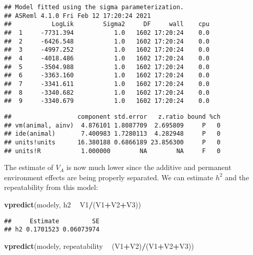 \documentclass[12pt,]{book}
\newenvironment{Shaded}{\begin{snugshade}}{\end{snugshade}}
\newcommand{\KeywordTok}[1]{\textcolor[rgb]{0.13,0.29,0.53}{\textbf{#1}}}
\newcommand{\NormalTok}[1]{#1}
\newcommand{\OperatorTok}[1]{\textcolor[rgb]{0.81,0.36,0.00}{\textbf{#1}}}
\newcommand{\StringTok}[1]{\textcolor[rgb]{0.31,0.60,0.02}{#1}}
\begin{document}
\begin{verbatim}
## Model fitted using the sigma parameterization.
## ASReml 4.1.0 Fri Feb 12 17:20:24 2021
##           LogLik        Sigma2     DF     wall    cpu
##  1     -7731.394           1.0   1602 17:20:24    0.0
##  2     -6426.548           1.0   1602 17:20:24    0.0
##  3     -4997.252           1.0   1602 17:20:24    0.0
##  4     -4018.486           1.0   1602 17:20:24    0.0
##  5     -3504.988           1.0   1602 17:20:24    0.0
##  6     -3363.160           1.0   1602 17:20:24    0.0
##  7     -3341.611           1.0   1602 17:20:24    0.0
##  8     -3340.682           1.0   1602 17:20:24    0.0
##  9     -3340.679           1.0   1602 17:20:24    0.0
\end{verbatim}

\begin{Shaded}
\end{Shaded}

\begin{verbatim}
##                  component std.error   z.ratio bound %ch
## vm(animal, ainv)  4.876101 1.8087709  2.695809     P   0
## ide(animal)       7.400983 1.7280113  4.282948     P   0
## units!units      16.380188 0.6866189 23.856300     P   0
## units!R           1.000000        NA        NA     F   0
\end{verbatim}

The estimate of \(V_A\) is now much lower since the additive and permanent environment effects are being properly separated. We can estimate \(h^2\) and the repeatability from this model:

\begin{Shaded}
\begin{Highlighting}[]
\KeywordTok{vpredict}\NormalTok{(modely, h2 }\OperatorTok{~}\StringTok{ }\NormalTok{V1}\OperatorTok{/}\NormalTok{(V1}\OperatorTok{+}\NormalTok{V2}\OperatorTok{+}\NormalTok{V3))}
\end{Highlighting}
\end{Shaded}

\begin{verbatim}
##     Estimate         SE
## h2 0.1701523 0.06073974
\end{verbatim}

\begin{Shaded}
\begin{Highlighting}[]
\KeywordTok{vpredict}\NormalTok{(modely, repeatability }\OperatorTok{~}\StringTok{ }\NormalTok{(V1}\OperatorTok{+}\NormalTok{V2)}\OperatorTok{/}\NormalTok{(V1}\OperatorTok{+}\NormalTok{V2}\OperatorTok{+}\NormalTok{V3))}
\end{Highlighting}
\end{Shaded}
\end{document}
